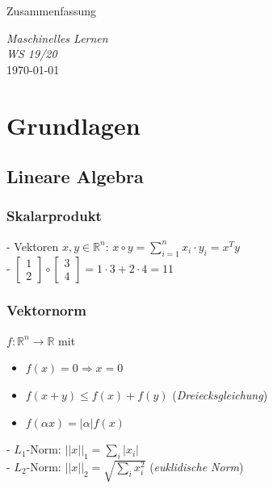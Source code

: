 \documentclass{report}
\begin{document}
\begin{center}
    \large Zusammenfassung
\end{center}

\begin{center}
    \Large \textit{Maschinelles Lernen}\\
    \vspace*{.5em}
    \normalsize \textit{WS 19/20}\\
    \vspace*{45em}
    \large \today
\end{center}

\newpage

\chapter{Grundlagen}
\vspace*{-1.25em}
\section{Lineare Algebra}
\subsection{Skalarprodukt}
- Vektoren $x, y \in \mathbb{R}^n$: $x\circ y = \sum_{i=1}^n x_i\cdot y_i = x^Ty$\\
- $\begin{bmatrix}1\\2\end{bmatrix}\circ \begin{bmatrix}3\\4\end{bmatrix} = 1\cdot 3 + 2\cdot 4 = 11$
\subsection{Vektornorm}
$f: \mathbb{R}^n\rightarrow \mathbb{R}$ mit\\
\vspace*{-1.5em}
\begin{itemize}
  \item $f(x) = 0 \Rightarrow x = 0$
  \item $f(x + y) \leq f(x) + f(y)$ (\textit{Dreiecksgleichung})
  \item $f(\alpha x) = |\alpha|f(x)$
\end{itemize}
- $L_1$-Norm: $||x||_1 = \sum_i|x_i|$\\
- $L_2$-Norm: $||x||_2 = \sqrt{\sum_i x_i^2}$ (\textit{euklidische Norm})
\end{document}
